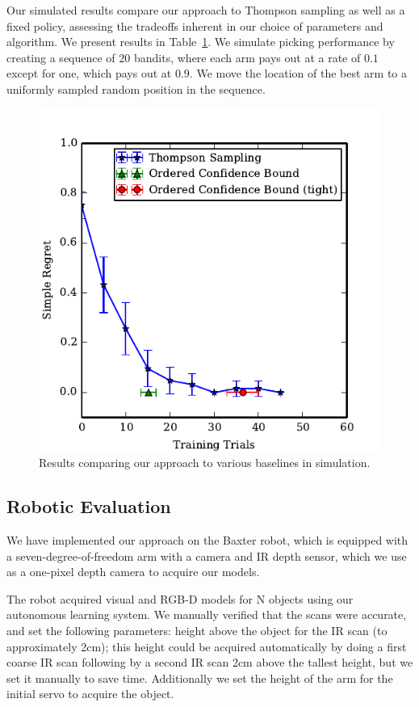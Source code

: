 \documentclass{article}
\begin{document}
Our simulated results compare our approach to Thompson sampling as
well as a fixed policy, assessing the tradeoffs inherent in our choice
of parameters and algorithm.  We present results in
Table~\ref{fig:simulation_results}.  We simulate picking performance
by creating a sequence of $20$ bandits, where each arm pays out at a
rate of $0.1$ except for one, which pays out at $0.9$.  We move the
location of the best arm to a uniformly sampled random position in the
sequence.
\begin{figure}
\includegraphics{figures/bestarm.pdf}
\caption{Results comparing our approach to various baselines in simulation.\label{fig:simulation_results}}
\end{figure}


\subsection{Robotic Evaluation}
 We have implemented our approach on the Baxter
robot, which is equipped with a seven-degree-of-freedom arm with a
camera and IR depth sensor, which we use as a one-pixel depth camera
to acquire our models.

The robot acquired visual and RGB-D models for N objects using our
autonomous learning system.  We manually verified that the scans were
accurate, and set the following parameters: height above the object
for the IR scan (to approximately 2cm); this height could be acquired
automatically by doing a first coarse IR scan following by a second IR
scan 2cm above the tallest height, but we set it manually to save
time.  Additionally we set the height of the arm for the initial servo
to acquire the object.
\end{document}
